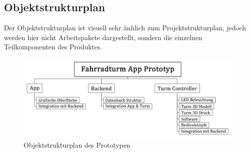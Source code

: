 \subsection{Objektstrukturplan}

Der Objektstrukturplan ist visuell sehr änhlich zum Projektstrukturplan, jedoch werden hier nicht Arbeitspakete dargestellt, sondern die einzelnen Teilkomponenten des Produktes.

\begin{figure}[ht]
  \centering
  \includegraphics[width=1\textwidth]{images/objektstrukturplan_prototyp}
  \caption{Objektstrukturplan des Prototypen}
  \label{fig:objektstrukturplan_prototyp}
\end{figure}